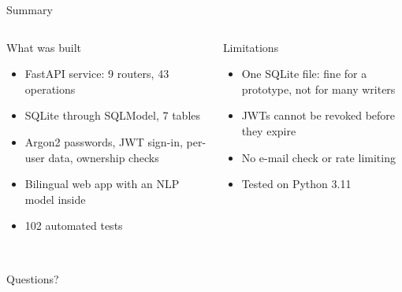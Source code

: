 \documentclass[aspectratio=169,11pt]{beamer}
\begin{document}
\begin{frame}{Summary}
\begin{columns}[T]
\begin{block}{What was built}
\small
\begin{itemize}
  \item FastAPI service: 9 routers, 43 operations
  \item SQLite through SQLModel, 7 tables
  \item Argon2 passwords, JWT sign-in, per-user data, ownership checks
  \item Bilingual web app with an NLP model inside
  \item 102 automated tests
\end{itemize}
\end{block}
\begin{block}{Limitations}
\small
\begin{itemize}
  \item One SQLite file: fine for a prototype, not for many writers
  \item JWTs cannot be revoked before they expire
  \item No e-mail check or rate limiting
  \item Tested on Python 3.11
\end{itemize}
\end{block}
\end{columns}
\vspace{16pt}
\\[3pt]{\small\color{ink2}Questions?}
\end{frame}
\end{document}
